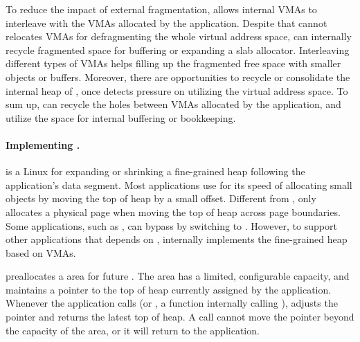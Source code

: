 To reduce the impact of external fragmentation, \thelibos{} allows internal VMAs to interleave with the VMAs allocated by the application.
Despite that \thelibos{} cannot relocates VMAs
for defragmenting the whole virtual address space,
\thelibos{} can internally recycle fragmented space for buffering or expanding a slab allocator.
Interleaving different types of VMAs
helps filling up the fragmented free space
with smaller objects or buffers.
Moreover, there are opportunities to recycle or consolidate the internal heap of \thelibos{},
once \thelibos{} detects pressure on utilizing the virtual address space.
To sum up, \thelibos{} can recycle the holes between VMAs allocated by the application, and utilize the space for internal buffering or bookkeeping.








\paragraph{Implementing .}


 is a Linux \linuxapi{} for expanding or shrinking a fine-grained heap following the application's data segment.
Most applications 
use  
for its speed of allocating 
small objects by moving the top of heap by a small offset.
Different from ,
 only allocates a physical page
when moving the top of heap across page boundaries.
Some applications, such as \gcc{}, can bypass  by switching to .
However, to support other applications that depends on ,
\thelibos{} internally implements the fine-grained heap
based on VMAs.



\thelibos{} preallocates a  area for future  \linuxapis{}.
The  area has a limited, configurable capacity,
and maintains a  pointer to the top of heap currently assigned by the application.
Whenever the application calls  (or , a \libc{} function internally calling ),
\thelibos{} adjusts the  pointer
and returns the latest top of heap.
A  call cannot move the  pointer beyond the capacity of the  area,
or it will return  to the application.


